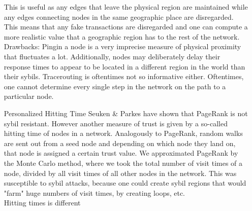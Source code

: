 \documentclass[11pt,a4paper]{report}
\theoremstyle{definition}
\theoremstyle{theorem}
\theoremstyle{proposition}
\theoremstyle{corollary}
\theoremstyle{lemma}
\theoremstyle{example}
\theoremstyle{remark}
\begin{document}
\begin{enumerate}
\noindent{}This is useful as any edges that leave the physical region are maintained while any edges connecting nodes in the same geographic place are disregarded. This means that any fake transactions are disregarded and one can compute a more realistic value that a geographic region has to the rest of the network. \vspace{1em}\\

\noindent{}Drawbacks: Pingin a node is a very imprecise measure of physical proximity that fluctuates a lot. Additionally, nodes may deliberately delay their response times to appear to be located in a different region in the world than their sybils. Tracerouting is oftentimes not so informative either. Oftentimes, one cannot determine every single step in the network on the path to a particular node.\vspace{1em}\\

\item[Personalized Hitting Time]Seuken \& Parkes have shown that PageRank is not sybil resistant. However another measure of trust is given by a so-called hitting time of nodes in a network. Analogously to PageRank, random walks are sent out from a seed node and depending on which node they land on, that node is assigned a certain trust value. We approximated PageRank by the Monte Carlo method, where we took the total number of visit times of a node, divided by all visit times of all other nodes in the network. This was susceptible to sybil attacks, because one could create sybil regions that would "farm" huge numbers of visit times, by creating loops, etc. \vspace{1em}\\

\noindent{}Hitting times is different 
\end{enumerate}
\end{document}
